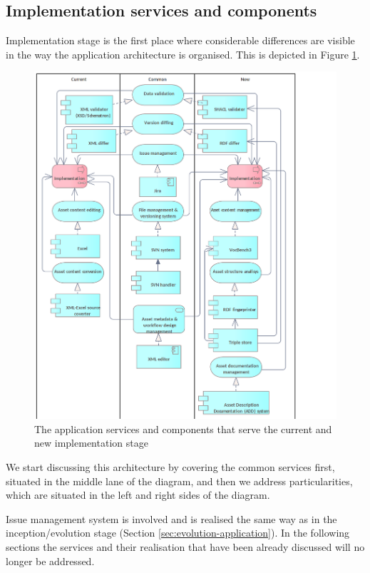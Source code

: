 	\subsection{Implementation services and components}
	\label{sec:implementation-application}	
	
	Implementation stage is the first place where considerable differences are visible in the way the application architecture is organised. This is depicted in Figure \ref{fig:application-implementation}.
	
	\begin{figure}[!h]
		\centering
		\includegraphics[width=.9\textwidth]{images/application/Implementation v3.png}
		\caption{The application services and components that serve the current and new implementation stage}
		\label{fig:application-implementation}
	\end{figure}
	
	We start discussing this architecture by covering the common services first, situated in the middle lane of the diagram, and then we address particularities, which are situated in the left and right sides of the diagram. 
	
	Issue management system is involved and is realised the same way as in the inception/evolution stage (Section \ref{sec:evolution-application}). In the following sections the services and their realisation that have been already discussed will no longer be addressed.  
	
